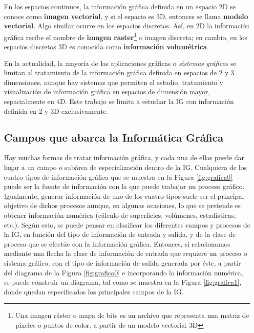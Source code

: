 En los espacios continuos, la información gráfica definida en un espacio 2D se conoce como \textbf{imagen vectorial}, y si el espacio es 3D, entonces se llama \textbf{modelo vectorial}. Algo similar ocurre en los espacios discretos. Así, en 2D la información gráfica recibe el nombre de \textbf{imagen raster}\footnote{Una imagen ráster o mapa de bits es un archivo que representa una matriz de píxeles o puntos de color, a partir de un modelo vectorial 3D} o imagen discreta; en cambio, en los espacios discretos 3D es conocida como \textbf{información volumétrica}.

En la actualidad, la mayoría de las aplicaciones gráficas o \textit{sistemas gráficos} se limitan al tratamiento de la información gráfica definida en espacios de 2 y 3 dimensiones, aunque hay sistemas que permiten el estudio, tratamiento y visualización de información gráfica en espacios de dimensión mayor, espacialmente en 4D. Este trabajo se limita a estudiar la IG con información definida en 2 y 3D exclusivamente.

\subsection{Campos que abarca la Informática Gráfica}
Hay muchas formas de tratar información gráfica, y cada una de ellas puede dar lugar a un campo o subárea de especialización dentro de la IG.
Cualquiera de los cuatro tipos de información gráfica que se muestra en la Figura \ref{fig:grafica0} puede ser la fuente de información con la que puede trabajar un proceso gráfico. Igualmente, generar información de uno de los cuatro tipos suele ser el principal objetivo de dichos procesos aunque, en algunas ocasiones, lo que se pretende es obtener información numérica (cálculo de superficies, volúmenes, estadísticas, etc.).
Según esto, se puede pensar en clasificar los diferentes campos y procesos de la IG, en función del tipo de información de entrada y salida, y de la clase de proceso que se efectúe con la información gráfica.
Entonces, si relacionamos mediante una flecha la clase de información de entrada que requiere un proceso o sistema gráfico, con el tipo de información de salida generada por éste, a partir del diagrama de la Figura \ref{fig:grafica0} e incorporando la información numérica, se puede construir un diagrama, tal como se muestra en la Figura \ref{fig:grafica1}, donde quedan especificados los principales campos de la IG.

